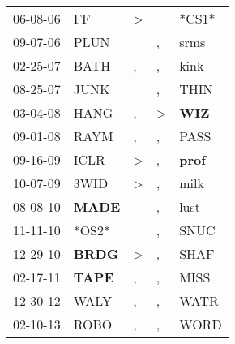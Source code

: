 \begin{supertabular}{p{0.07\textwidth}p{0.06\textwidth}p{0.02\textwidth}p{0.02\textwidth}p{0.06\textwidth}}
          06-08-06\textsuperscript{} &             FF\textsuperscript{} &     \textgreater &                  &                            *CS1* \\
          09-07-06\textsuperscript{} &           PLUN\textsuperscript{} &                  &                , &           srms\textsuperscript{} \\
          02-25-07\textsuperscript{} &           BATH\textsuperscript{} &                , &                , &           kink\textsuperscript{} \\
          08-25-07\textsuperscript{} &           JUNK\textsuperscript{} &                  &                , &           THIN\textsuperscript{} \\
          03-04-08\textsuperscript{} &           HANG\textsuperscript{} &                , &     \textgreater &   \textbf{WIZ\textsuperscript{}} \\
          09-01-08\textsuperscript{} &           RAYM\textsuperscript{} &                , &                , &           PASS\textsuperscript{} \\
          09-16-09\textsuperscript{} &           ICLR\textsuperscript{} &     \textgreater &                , &  \textbf{prof\textsuperscript{}} \\
          10-07-09\textsuperscript{} &           3WID\textsuperscript{} &     \textgreater &                , &           milk\textsuperscript{} \\
          08-08-10\textsuperscript{} &  \textbf{MADE\textsuperscript{}} &                  &                , &           lust\textsuperscript{} \\
          11-11-10\textsuperscript{} &                            *OS2* &                  &                , &           SNUC\textsuperscript{} \\
          12-29-10\textsuperscript{} &  \textbf{BRDG\textsuperscript{}} &     \textgreater &                , &           SHAF\textsuperscript{} \\
          02-17-11\textsuperscript{} &  \textbf{TAPE\textsuperscript{}} &                , &                , &           MISS\textsuperscript{} \\
          12-30-12\textsuperscript{} &           WALY\textsuperscript{} &                , &                , &           WATR\textsuperscript{} \\
          02-10-13\textsuperscript{} &           ROBO\textsuperscript{} &                , &                , &           WORD\textsuperscript{} \\

\end{supertabular}

